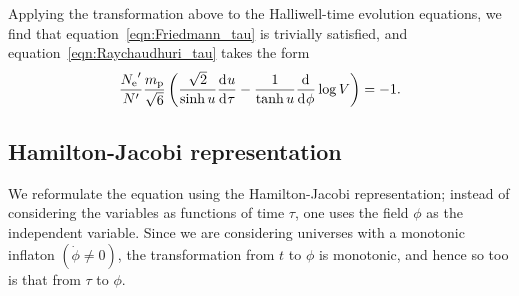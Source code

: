 %
Applying the transformation above to the Halliwell-time evolution equations, we find that equation~\eqref{eqn:Friedmann_tau} is trivially satisfied, and equation~\eqref{eqn:Raychaudhuri_tau} takes the form
%
\begin{equation}
  \frac{{{N_\mathrm{e}}^\prime}}{{{N}^\prime}} \frac{m_{\mathrm{p}}}{\sqrt{6}}
  \left(\frac{\sqrt{2}}{\sinh u} \frac{\operatorname{d}^{}\!{u}}{\operatorname{d}^{}\!{\tau}} 
  - \frac{1}{\tanh u} \frac{\operatorname{d}^{}\!{}}{\operatorname{d}^{}\!{\phi}}\log V\right) 
  = -1.
  \label{eqn:master_tau}
\end{equation}
%

\subsection{Hamilton-Jacobi representation}
\label{sec:Hamilton-Jacobi_representations}
We reformulate the equation using the Hamilton-Jacobi representation; instead of considering the variables as functions of time $\tau$, one uses the field $\phi$ as the independent variable. Since we are considering universes with a monotonic inflaton $(\dot{\phi}\ne 0)$, the transformation from $t$ to $\phi$ is monotonic, and hence so too is that from $\tau$ to $\phi$.

